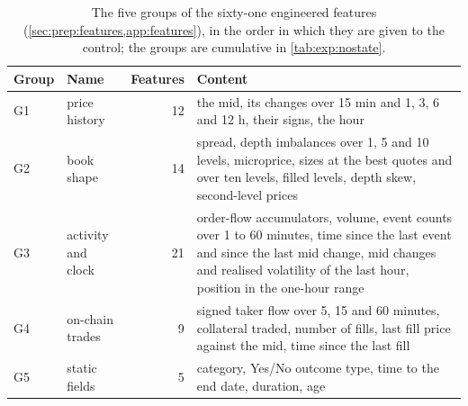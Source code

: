 \begin{table}[t]
\centering
\caption{The five groups of the sixty-one engineered features
(\cref{sec:prep:features,app:features}), in the order in which they are given to the
control; the groups are cumulative in \cref{tab:exp:nostate}.}
\label{tab:exp:groups}
\small
\begin{fittable}\begin{tabular}{llrp{8.6cm}}
\toprule
Group & Name & Features & Content \\
\midrule
G1 & price history & 12 & the mid, its changes over 15 min and 1, 3, 6 and 12 h, their signs, the hour \\
G2 & book shape & 14 & spread, depth imbalances over 1, 5 and 10 levels, microprice, sizes at the best quotes and over ten levels, filled levels, depth skew, second-level prices \\
G3 & activity and clock & 21 & order-flow accumulators, volume, event counts over 1 to 60 minutes, time since the last event and since the last mid change, mid changes and realised volatility of the last hour, position in the one-hour range \\
G4 & on-chain trades & 9 & signed taker flow over 5, 15 and 60 minutes, collateral traded, number of fills, last fill price against the mid, time since the last fill \\
G5 & static fields & 5 & category, Yes/No outcome type, time to the end date, duration, age \\
\bottomrule
\end{tabular}\end{fittable}
\end{table}

